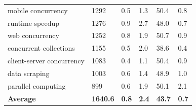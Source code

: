 \begin{table}[tbp]
\begin{tabular}{p{1.7in}p{.5in}p{.6in}p{.4in}p{.9in}p{.9in}}
mobile concurrency & 1292 & 0.5 & 1.3 & 50.4 & 0.8\\ 
runtime speedup & 1276 & 0.9 & 2.7 & 48.0 & 0.7\\ 
web concurrency & 1252 & 0.8 & 1.9 & 50.7 & 0.9 \\ 
concurrent collections & 1155 & 0.5 & 2.0 & 38.6 & 0.4 \\ 
client-server concurrency & 1083 & 0.4 & 1.1 & 50.4 & 0.9\\ 
data scraping & 1003 & 0.6 & 1.4 & 48.9 & 1.0 \\ 
parallel computing & 899 & 0.6 & 1.9 & 50.1 & 2.1\\ \hline
\textbf{Average} & \textbf{1640.6} & \textbf{0.8} & \textbf{2.4} & \textbf{43.7} & \textbf{0.7}\\ \hline
\end{tabular}
\end{table}

